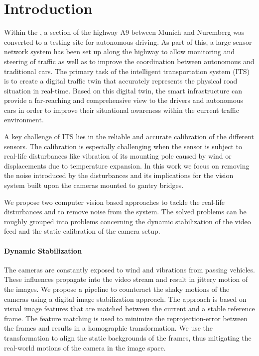 
\section{Introduction}

Within the \Providentia{}, a section of the highway A9 between Munich and Nuremberg was converted to a testing site for autonomous driving. 
As part of this, a large sensor network system has been set up along the highway to allow monitoring and steering of traffic as well as to improve the coordination between autonomous and traditional cars. 
The primary task of the intelligent transportation system (ITS) is to create a digital traffic twin that accurately represents the physical road situation in real-time. 
Based on this digital twin, the smart infrastructure can provide a far-reaching and comprehensive view to the drivers and autonomous cars in order to improve their situational awareness within the current traffic environment.

A key challenge of ITS lies in the reliable and accurate calibration of the different sensors.
The calibration is especially challenging when the sensor is subject to real-life disturbances like vibration of its mounting pole caused by wind or displacements due to temperature expansion.
In this work we focus on removing the noise introduced by the disturbances and its implications for the vision system built upon the cameras mounted to gantry bridges.

We propose two computer vision based approaches to tackle the real-life disturbances and to remove noise from the system.
The solved problems can be roughly grouped into problems concerning the dynamic stabilization of the video feed and the static calibration of the camera setup.

\paragraph{Dynamic Stabilization}
The cameras are constantly exposed to wind and vibrations from passing vehicles.
These influences propagate into the video stream and result in jittery motion of the images.
We propose a pipeline to counteract the shaky motions of the cameras using a digital image stabilization approach.
The approach is based on visual image features that are matched between the current and a stable reference frame. 
The feature matching is used to minimize the reprojection-error between the frames and results in a homographic transformation.
We use the transformation to align the static backgrounds of the frames, thus mitigating the real-world motions of the camera in the image space.

